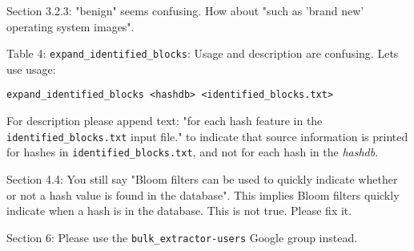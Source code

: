 \documentclass[12pt,twoside]{article}
\newcommand{\hdb}{\emph{hashdb}\xspace}
\begin{document}
Section 3.2.3: "benign" seems confusing.
How about "such as 'brand new' operating system images".

Table 4: \texttt{expand\_identified\_blocks}:
Usage and description are confusing.
Lets use usage:
\begin{verbatim}
expand_identified_blocks <hashdb> <identified_blocks.txt>
\end{verbatim}

For description please append text:
"for each hash feature in the \texttt{identified\_blocks.txt} input file."
to indicate that source information is printed for hashes in
\texttt{identified\_blocks.txt}, and not for each hash in the \hdb.

Section 4.4: You still say "Bloom filters can be used to quickly indicate
whether or not a hash value is found in the database".
This implies Bloom filters quickly indicate when a hash is in the database.
This is not true.  Please fix it.

Section 6: Please use the \texttt{bulk\_extractor-users} Google group instead.
\end{document}
